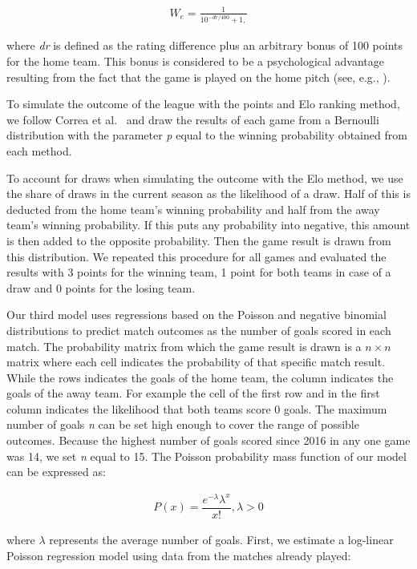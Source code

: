 \documentclass[12pt,a4paper]{article}
\begin{document}
\begin{align}
W_e = \frac{1}{10^{-dr/400}+1,}
\end{align}

where \emph{dr} is defined as the rating difference plus an arbitrary
bonus of 100 points for the home team. This bonus is considered to be a
psychological advantage resulting from the fact that the game is played
on the home pitch (see, e.g., \textcite{Pollard2008}).

To simulate the outcome of the league with the points and Elo ranking
method, we follow Correa et al.~\autocite*{correa} and draw the results
of each game from a Bernoulli distribution with the parameter \emph{p}
equal to the winning probability obtained from each method.

To account for draws when simulating the outcome with the Elo method, we
use the share of draws in the current season as the likelihood of a
draw. Half of this is deducted from the home team's winning probability
and half from the away team's winning probability. If this puts any
probability into negative, this amount is then added to the opposite
probability. Then the game result is drawn from this distribution. We
repeated this procedure for all games and evaluated the results with 3
points for the winning team, 1 point for both teams in case of a draw
and 0 points for the losing team.

Our third model uses regressions based on the Poisson and negative
binomial distributions to predict match outcomes as the number of goals
scored in each match. The probability matrix from which the game result
is drawn is a \(n \times n\) matrix where each cell indicates the
probability of that specific match result. While the rows indicates the
goals of the home team, the column indicates the goals of the away team.
For example the cell of the first row and in the first column indicates
the likelihood that both teams score \(0\) goals. The maximum number of
goals \emph{n} can be set high enough to cover the range of possible
outcomes. Because the highest number of goals scored since 2016 in any
one game was 14, we set \emph{n} equal to 15. The Poisson probability
mass function of our model can be expressed as:

\begin{align}
P(x) = \dfrac{e^{-\lambda}\lambda^x}{x!}, \lambda > 0
\end{align}

where \(\lambda\) represents the average number of goals. First, we
estimate a log-linear Poisson regression model using data from the
matches already played:
\end{document}
